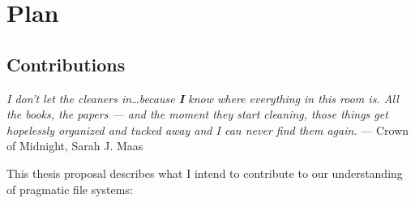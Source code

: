 \chapter{Plan}
\label{ch:plan}


\section{Contributions}
\label{ch:introduction:sec:contributions}

\begin{epigraph}
    \textit{I don't let the cleaners in\ldots because \textbf{I} know where
        everything in this room is.  All the books, the papers --- and the moment
        they start cleaning, those things get hopelessly organized and tucked away
        and I can never find them again.} --- Crown of Midnight, Sarah J. Maas
\end{epigraph}

This thesis proposal describes what I intend to contribute to our understanding
of pragmatic file systems:

